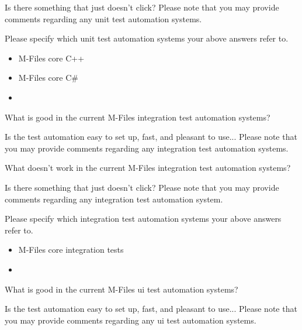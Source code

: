 \begin{question}[resume]
	\begin{surveydescription}
		Is there something that just doesn't click? Please note that you may provide comments regarding any unit test automation systems.
	\end{surveydescription}
	\longtextfield
	\item Please specify which unit test automation systems your above answers refer to.\greencheckmark
	\begin{itemize}[noitemsep, leftmargin=1.5em]
		\renewcommand\labelitemi{$\square$}
		\item M-Files core C++
		\item M-Files core C\#
		\item \othertextfield
	\end{itemize}
	\item What is good in the current M-Files integration test automation systems?\greencheckmark\label{survey_question:good_in_integration_test_automation}\\
	\begin{surveydescription}
		Is the test automation easy to set up, fast, and pleasant to use... Please note that you may provide comments regarding any integration test automation systems.
	\end{surveydescription}
	\longtextfield
	\item What doesn't work in the current M-Files integration test automation systems?\greencheckmark\\
	\begin{surveydescription}
		Is there something that just doesn't click? Please note that you may provide comments regarding any integration test automation system.
	\end{surveydescription}
	\longtextfield
	\item Please specify which integration test automation systems your above answers refer to.\greencheckmark
	\begin{itemize}[noitemsep, leftmargin=1.5em]
		\renewcommand\labelitemi{$\square$}
		\item M-Files core integration tests
		\item \othertextfield
	\end{itemize}
	\item What is good in the current M-Files \gls{ui} test automation systems?\greencheckmark\label{survey_question:good_in_ui_test_automation}\\
	\begin{surveydescription}
		Is the test automation easy to set up, fast, and pleasant to use... Please note that you may provide comments regarding any \gls{ui} test automation systems.

\end{surveydescription}
\end{question}
